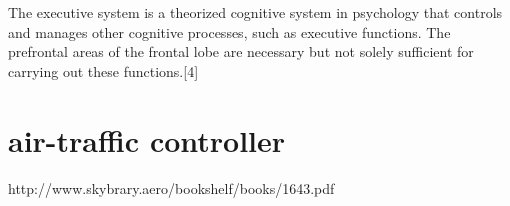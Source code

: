 \documentclass[11pt]{article}
\begin{document}
The executive system is a theorized cognitive system in psychology that
controls and manages other cognitive processes, such as executive
functions. The prefrontal areas of the frontal lobe are necessary but
not solely sufficient for carrying out these functions.{[}4{]}


\section{air-traffic controller}
http://www.skybrary.aero/bookshelf/books/1643.pdf
\end{document}
